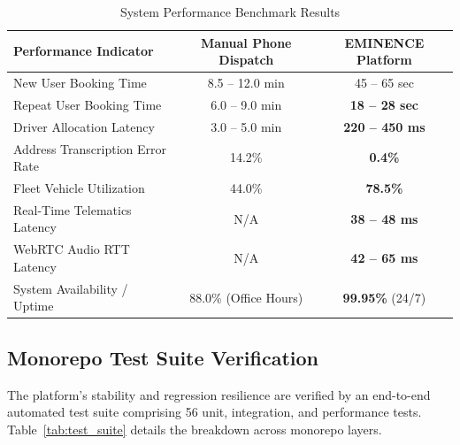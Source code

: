 \documentclass[conference]{IEEEtran}
\begin{document}
\begin{table}[htbp]
\centering
\caption{System Performance Benchmark Results}
\label{tab:benchmarks}
\begin{tabular}{lcc}
\toprule
\textbf{Performance Indicator} & \textbf{Manual Phone Dispatch} & \textbf{EMINENCE Platform} \\
\midrule
New User Booking Time & 8.5 -- 12.0 min & 45 -- 65 sec \\
Repeat User Booking Time & 6.0 -- 9.0 min & \textbf{18 -- 28 sec} \\
Driver Allocation Latency & 3.0 -- 5.0 min & \textbf{220 -- 450 ms} \\
Address Transcription Error Rate & 14.2\% & \textbf{0.4\%} \\
Fleet Vehicle Utilization & 44.0\% & \textbf{78.5\%} \\
Real-Time Telematics Latency & N/A & \textbf{38 -- 48 ms} \\
WebRTC Audio RTT Latency & N/A & \textbf{42 -- 65 ms} \\
System Availability / Uptime & 88.0\% (Office Hours) & \textbf{99.95\%} (24/7) \\
\bottomrule
\end{tabular}
\end{table}

\subsection{Monorepo Test Suite Verification}
The platform's stability and regression resilience are verified by an end-to-end automated test suite comprising 56 unit, integration, and performance tests. Table~\ref{tab:test_suite} details the breakdown across monorepo layers.
\end{document}
